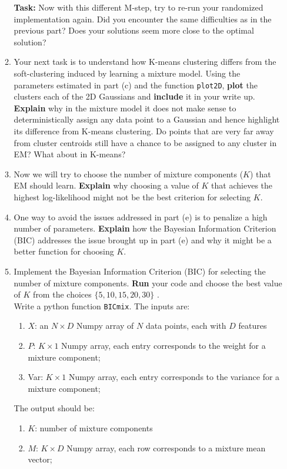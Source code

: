 \begin{enumerate}
\begin{enumerate}
\textbf{Task: }Now with this different M-step, try to re-run your randomized implementation again. Did you encounter the same difficulties as in the previous part? Does your solutions seem more close to the optimal solution?


\item Your next task is to understand how K-means clustering differs from the soft-clustering induced by learning a mixture model. Using the parameters estimated in part (c) and the function \texttt{plot2D}, \textbf{plot} the clusters each of the 2D Gaussians and \textbf{include} it in your write up. \textbf{Explain} why in the mixture model it does not make sense to deterministically assign any data point to a Gaussian and hence highlight its difference from K-means clustering. Do points that are very far away from cluster centroids still have a chance to be assigned to any cluster in EM? What about in K-means?

\item Now we will try to choose the number of mixture components ($K$) that EM should learn. \textbf{Explain} why choosing a value of $K$ that achieves the highest log-likelihood might not be the best criterion for selecting $K$.

\item One way to avoid the issues addressed in part (e) is to penalize a high number of parameters. \textbf{Explain} how the Bayesian Information Criterion (BIC) addresses the issue brought up in part (e) and why it might be a better function for choosing $K$.

\item Implement the Bayesian Information Criterion (BIC) for selecting the number of mixture components. \textbf{Run} your code and choose the best value of $K$ from the choices $\{ 5, 10, 15, 20 , 30\}$ .\\
    Write a python function \texttt{BICmix}. The inputs are:
    \begin{enumerate}
    \item $X$: an $N \times D$ Numpy array of $N$ data points, each with $D$ features
    \item $P$: $K \times 1$ Numpy array, each entry corresponds to the weight for a mixture component;
    \item Var: $K \times 1$ Numpy array, each entry corresponds to the variance for a mixture component;
    \end{enumerate}
    The output should be:
    \begin{enumerate}
    \item $K$: number of mixture components
    \item $M$: $K \times D$ Numpy array, each row corresponds to a mixture mean vector;
    \end{enumerate}
\end{enumerate}


\end{enumerate}

